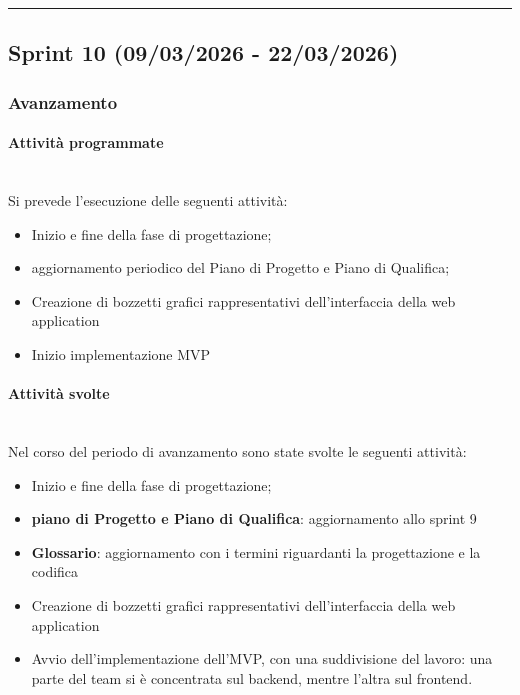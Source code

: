 \documentclass[10pt, letterpaper]{article}
\newcommand{\trisubsection}[1]{\paragraph{#1}\mbox{}\\}
\begin{document}
\vspace{1em}
    \hrule
    \vspace{1em}

    \subsection{Sprint 10 (09/03/2026 - 22/03/2026)}
    \subsubsection{Avanzamento}
    \trisubsection{Attività programmate}
    Si prevede l'esecuzione delle seguenti attività:
    \begin{itemize}
        \item Inizio e fine della fase di progettazione;
        \item aggiornamento periodico del Piano di Progetto e Piano di Qualifica;
        \item Creazione di bozzetti grafici rappresentativi dell’interfaccia della web application
        \item Inizio implementazione MVP
    \end{itemize}

    \trisubsection{Attività svolte}
    Nel corso del periodo di avanzamento sono state svolte le seguenti attività:
    \begin{itemize}
        \item Inizio e fine della fase di progettazione;
        \item \textbf{piano di Progetto e Piano di Qualifica}: aggiornamento allo sprint 9
        \item \textbf{Glossario}: aggiornamento con i termini riguardanti la progettazione e la codifica
        \item Creazione di bozzetti grafici rappresentativi dell’interfaccia della web application
        \item Avvio dell’implementazione dell’MVP, con una suddivisione del lavoro: una parte del team si è concentrata sul backend, mentre l’altra sul frontend.
    \end{itemize}
\end{document}
